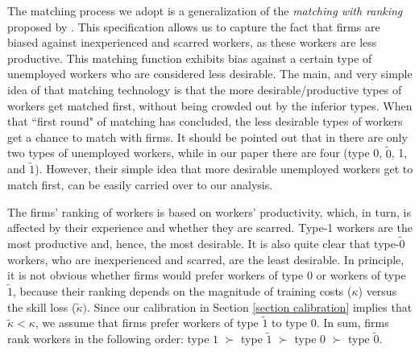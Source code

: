 \documentclass[12pt]{article} %
\theoremstyle{definition}
\begin{document}
The matching process we adopt is a generalization of the \cite{blanchard1994ranking} \textit{matching with ranking} proposed by \cite{petrongolo2001looking}.
This specification allows us to capture the fact that firms are biased against inexperienced and scarred workers, as these workers are less productive. This matching function exhibits bias against a certain type of unemployed workers who are considered less desirable. The main, and very simple idea of that matching technology is that the more desirable/productive types of workers get matched first, without being crowded out by the inferior types. When that ``first round" of matching has concluded, the less desirable types of workers get a chance to match with firms. It should be pointed out that in \cite{petrongolo2001looking} there are only two types of unemployed workers, while in our paper there are four (type 0, $\tilde{0}$, 1, and $\tilde{1}$). However, their simple idea that more desirable unemployed workers get to match first, can be easily carried over to our analysis. 



The firms' ranking of workers is based on workers' productivity, which, in turn, is affected by their experience and whether they are scarred. Type-1 workers are the most productive and, hence, the most desirable. It is also quite clear that type-$\tilde{0}$ workers, who are inexperienced and scarred, are the least desirable. In principle, it is not obvious whether firms would prefer workers of type 0 or workers of type $\tilde{1}$, because their ranking depends on the magnitude of training costs ($\kappa$) versus the skill loss ($\tilde{\kappa})$. Since our calibration in Section \ref{section calibration} implies that $\tilde{\kappa}< \kappa$, we assume that firms prefer workers of type $\tilde{1}$ to type $0$. In sum, firms rank workers in the following order: type $1$ $\succ$  type $\tilde{1}$ $\succ$ type 0 $\succ$  type $\tilde{0}$. 
\end{document}
